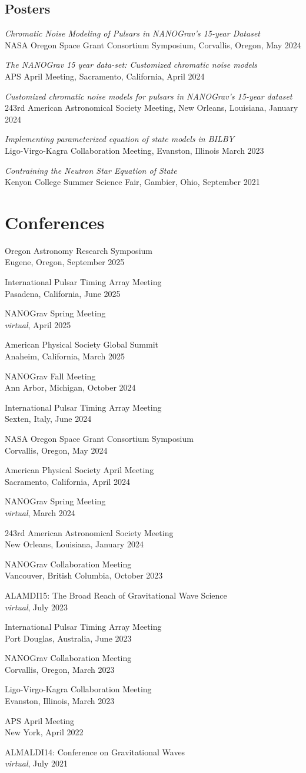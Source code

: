 \documentclass[11pt,letterpaper,sans,unicode]{moderncv}
\newcommand{\confitem}[3]{\item {#1}\\{#2}, #3}
\newcommand{\talkitem}[3]{\item \textit{#1}\\{#2}, #3} %
\begin{document}
{\begin{etaremune}[leftmargin=8mm]
\end{etaremune}
\subsection{Posters}
\begin{etaremune}[leftmargin=8mm]
\small
\talkitem{Chromatic Noise Modeling of Pulsars in NANOGrav's 15-year Dataset}{NASA Oregon Space Grant Consortium Symposium}{Corvallis, Oregon, May 2024}
\talkitem{The NANOGrav 15 year data-set: Customized chromatic noise models}{APS April Meeting}{Sacramento, California, April 2024}
\talkitem{Customized chromatic noise models for pulsars in NANOGrav's 15-year dataset}{243rd American Astronomical Society Meeting}{New Orleans, Louisiana, January 2024}
\talkitem{Implementing parameterized equation of state models in BILBY}{Ligo-Virgo-Kagra Collaboration Meeting}{Evanston, Illinois March 2023}
\talkitem{Contraining the Neutron Star Equation of State}{Kenyon College Summer Science Fair}{Gambier, Ohio, September 2021}
\end{etaremune}


\section{Conferences}
\begin{etaremune}[leftmargin=8mm]
	\confitem{Oregon Astronomy Research Symposium}{Eugene, Oregon}{September 2025}
	\confitem{International Pulsar Timing Array Meeting}{Pasadena, California}{June 2025}
	\confitem{NANOGrav Spring Meeting}{\textit{virtual}}{April 2025}
	\confitem{American Physical Society Global Summit}{Anaheim, California}{March 2025}
	\confitem{NANOGrav Fall Meeting}{Ann Arbor, Michigan}{October 2024}
	\confitem{International Pulsar Timing Array Meeting}{Sexten, Italy}{June 2024}
	\confitem{NASA Oregon Space Grant Consortium Symposium}{Corvallis, Oregon}{May 2024}
    \confitem{American Physical Society April Meeting}{Sacramento, California}{April 2024}
    \confitem{NANOGrav Spring Meeting}{\textit{virtual}}{March 2024} 
    \confitem{243rd American Astronomical Society Meeting}{New Orleans, Louisiana}{January 2024}    \confitem{NANOGrav Collaboration Meeting}{Vancouver, British Columbia}{October 2023}
    \confitem{ALAMDI15: The Broad Reach of Gravitational Wave Science}{\textit{virtual}}{July 2023}
    \confitem{International Pulsar Timing Array Meeting}{Port Douglas, Australia}{June 2023}
    \confitem{NANOGrav Collaboration Meeting}{Corvallis, Oregon}{March 2023}
    \confitem{Ligo-Virgo-Kagra Collaboration Meeting}{Evanston, Illinois}{March 2023}
    \confitem{APS April Meeting}{New York}{April 2022}
    \confitem{ALMALDI14: Conference on Gravitational Waves}{\textit{virtual}}{July 2021}
\end{etaremune}

}
\end{document}
